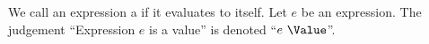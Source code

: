 \begin{node}\label{sml-0006}%
We call an expression a  if it evaluates to itself.
Let $e$ be an expression. The judgement ``Expression $e$ is a value'' is
denoted ``$e~\Value$''.
\end{node}
